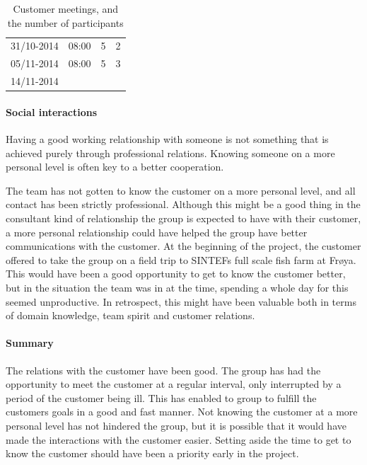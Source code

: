 \documentclass[11pt,a4paper,titlepage,oneside]{report}
\begin{document}
\begin{table}
\begin{center}
\begin{tabular}{llcc}
31/10-2014               & 08:00                     & 5                                                                & 2                                                                           \\
05/11-2014                & 08:00                     & 5                                                                & 3                                                                           \\
14/11-2014               &                           &                                                                  &                                                                            
\end{tabular}
\caption{Customer meetings, and the number of participants}
\label{tab:CustomerMeetings}
\end{center}
\end{table}

\paragraph{Social interactions}
Having a good working relationship with someone is not something that is achieved purely through professional relations. Knowing someone on a more personal level is often key to a better cooperation. 

The team has not gotten to know the customer on a more personal level, and all contact has been strictly professional. Although this might be a good thing in the consultant kind of relationship the group is expected to have with their customer, a more personal relationship could have helped the group have better communications with the customer. At the beginning of the project, the customer offered to take the group on a field trip to SINTEFs full scale fish farm at Frøya. This would have been a good opportunity to get to know the customer better, but in the situation the team was in at the time, spending a whole day for this seemed unproductive. In retrospect, this might have been valuable both in terms of domain knowledge, team spirit and customer relations. 

\paragraph{Summary}
The relations with the customer have been good. The group has had the opportunity to meet the customer at a regular interval, only interrupted by a period of the customer being ill. This has enabled to group to fulfill the customers goals in a good and fast manner. Not knowing the customer at a more personal level has not hindered the group, but it is possible that it would have made the interactions with the customer easier. Setting aside the time to get to know the customer should have been a priority early in the project. 
\end{document}
